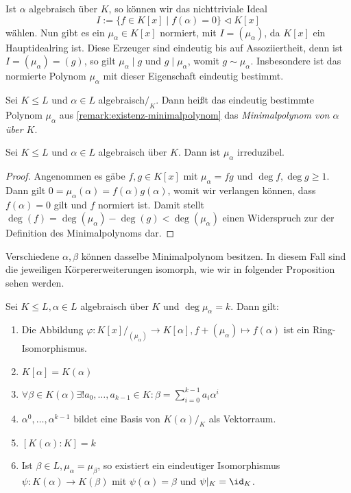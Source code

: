 \begin{remark}\label{remark:existenz-minimalpolynom}
    Ist $\alpha$ algebraisch über $K$, so können wir das nichttriviale Ideal
    $$ I := \{ f \in K[x] \mid f(\alpha) = 0 \} \vartriangleleft K[x] $$
    wählen. Nun gibt es ein $\mu_\alpha \in K[x]$ normiert, mit $I = (\mu_\alpha)$, da $K[x]$ ein Hauptidealring ist. Diese Erzeuger sind eindeutig bis auf Assoziiertheit, denn ist $I = (\mu_\alpha) = (g)$, so gilt $\mu_\alpha \mid g$ und $g \mid \mu_\alpha$, womit $g \sim \mu_\alpha$. Insbesondere ist das normierte Polynom $\mu_\alpha$ mit dieser Eigenschaft eindeutig bestimmt.
\end{remark}

\begin{definition}
    Sei $K\le L$ und $\alpha\in L$ algebraisch$/_K$. Dann heißt das eindeutig bestimmte Polynom $\mu_\alpha$ aus \cref{remark:existenz-minimalpolynom} das \emph{Minimalpolynom von $\alpha$ über $K$}.
\end{definition}

\begin{lemma}
    Sei $K\le L$ und $\alpha\in L$ algebraisch über $K$. Dann ist $\mu_\alpha$ irreduzibel.
\end{lemma}

\begin{proof}
    Angenommen es gäbe $f,g\in K[x]$ mit $\mu_\alpha=fg$ und $\deg f,\deg g\ge 1$. Dann gilt $0=\mu_\alpha(\alpha)=f(\alpha)g(\alpha)$, womit wir \obda verlangen können, dass $f(\alpha)=0$ gilt und $f$ normiert ist. Damit stellt $\deg(f)=\deg(\mu_\alpha)-\deg(g)<\deg(\mu_\alpha)$ einen Widerspruch zur der Definition des Minimalpolynoms dar.
\end{proof}

Verschiedene $\alpha, \beta$ können dasselbe Minimalpolynom besitzen. In diesem Fall sind die jeweiligen Körpererweiterungen isomorph, wie wir in folgender Proposition sehen werden.

\begin{proposition} \label{prop:minimalpolynom_erweiterung}
    Sei $K \leq L, \alpha \in L$ algebraisch über $K$ und $\deg \mu_\alpha = k$. Dann gilt:
    \begin{enumerate}
        \item Die Abbildung $\varphi : K[x]/_{(\mu_\alpha)} \to K[\alpha], f + (\mu_\alpha) \mapsto f(\alpha)$ ist ein Ring-Isomorphismus.
        \item $K[\alpha] = K(\alpha)$
        \item $\forall \beta \in K(\alpha) \exists ! a_0, \hdots, a_{k-1} \in K: \beta = \sum_{i=0}^{k-1}a_i \alpha^i$
        \item $\alpha^0, \hdots, \alpha^{k-1}$ bildet eine Basis von $K(\alpha)/_K$ als Vektorraum.
        \item $[K(\alpha) : K] = k$
        \item Ist $\beta \in L, \mu_\alpha = \mu_\beta$, so existiert ein eindeutiger Isomorphismus $\psi : K(\alpha) \to K(\beta)$ mit $\psi(\alpha) = \beta$ und $\psi\vert_K = \id_K$.
    \end{enumerate}
\end{proposition}

